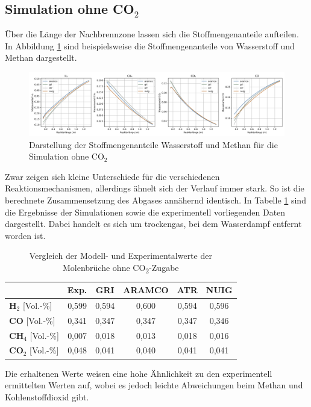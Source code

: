 \documentclass[footmark=none]{tubaf-thesis}
\begin{document}
        \subsection{Simulation ohne CO$_2$}
        Über die Länge der Nachbrennzone lassen sich die Stoffmengenanteile aufteilen. In Abbildung \ref{fig:vergleich_h2_ch4_keinco2} sind beispielsweise die Stoffmengenanteile von Wasserstoff und Methan dargestellt.
        \begin{figure}[H]
            \centering
            \includegraphics[width=1\linewidth]{img/Vergleich_mech/CO_CO2_keinCO2.png}
            \caption{Darstellung der Stoffmengenanteile Wasserstoff und Methan für die Simulation ohne CO$_2$}
            \label{fig:vergleich_h2_ch4_keinco2}
        \end{figure}
        Zwar zeigen sich kleine Unterschiede für die verschiedenen Reaktionsmechanismen, allerdings ähnelt sich der Verlauf immer stark. So ist die berechnete Zusammensetzung des Abgases annähernd identisch. In Tabelle \ref{tab:vergleich_abgaszusammensetzung_keinco2} sind die Ergebnisse der Simulationen sowie die experimentell vorliegenden Daten dargestellt. Dabei handelt es sich um trockengas, bei dem Wasserdampf entfernt worden ist. 
        \begin{table}[H]
            \centering
            \caption{Vergleich der Modell- und Experimentalwerte der Molenbrüche ohne CO\textsubscript{2}-Zugabe}
            \label{tab:vergleich_abgaszusammensetzung_keinco2}
            \begin{tabular}{lccccc}
                \toprule
                & \textbf{Exp.} & \textbf{GRI} & \textbf{ARAMCO} & \textbf{ATR} & \textbf{NUIG} \\
                \midrule
                \textbf{H$_2$} [Vol.-\%] & 0,599 & 0,594 & 0,600 & 0,594 & 0,596 \\
                \textbf{CO} [Vol.-\%]& 0,341 & 0,347 & 0,347 & 0,347 & 0,346 \\
                \textbf{CH$_4$} [Vol.-\%]& 0,007 & 0,018 & 0,013 & 0,018 & 0,016 \\
                \textbf{CO$_2$} [Vol.-\%]& 0,048 & 0,041 & 0,040 & 0,041 & 0,041 \\
                \bottomrule
            \end{tabular}
        \end{table}
        Die erhaltenen Werte weisen eine hohe Ähnlichkeit zu den experimentell ermittelten Werten auf, wobei es jedoch leichte Abweichungen beim Methan und Kohlenstoffdioxid gibt. 
\end{document}
